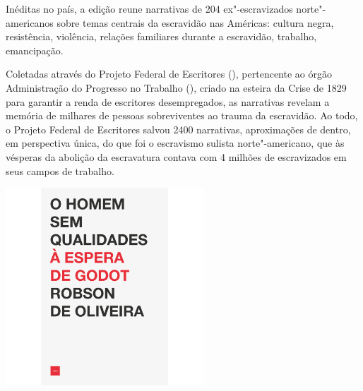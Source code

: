 \hspace*{-7cm}\hrulefill\hspace*{-7cm}

\medskip

\noindent{}Inéditas no país, a edição reune narrativas de 204 ex"-escravizados norte"-americanos sobre temas centrais da escravidão nas Américas: cultura negra, resistência, violência, relações familiares durante a escravidão, trabalho, emancipação. %

Coletadas através do Projeto Federal de Escritores (), pertencente ao órgão Administração do Progresso no Trabalho (), criado na esteira da Crise de 1829 para garantir a renda de escritores desempregados, as narrativas revelam a memória de milhares de pessoas sobreviventes ao trauma da escravidão. Ao todo, o Projeto Federal de Escritores salvou 2400 narrativas, aproximações de dentro, em perspectiva única, do que foi o escravismo sulista norte"-americano, que às vésperas da abolição da escravatura contava com 4 milhões de escravizados em seus campos de trabalho.

\vfill

\hspace*{-.4cm}\begin{minipage}[c]{.6\linewidth}
\small{
{}}
\end{minipage}


\pagebreak


\begin{center}
\hspace*{.5cm}\includegraphics[width=74mm]{./grid/robson.png}
\end{center}

